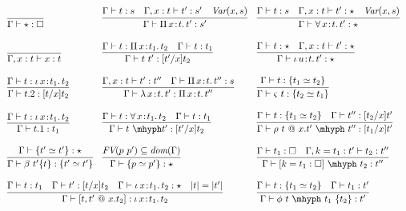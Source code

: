 \documentclass{article}
\newcommand{\abs}[4]{{#1}\, #2\! : \! #3.\, #4}
\begin{document}
\begin{figure}
  \[
  \begin{array}{lll}
    \infer{\Gamma\vdash \star : \Box}{\ } &
    \infer{\Gamma\vdash\abs{\Pi}{x}{t}{t'} : s'}{\Gamma \vdash t : s \quad \Gamma,x:t\vdash t' : s' \quad \textit{Var}(x,s)} &
    \infer{\Gamma\vdash\abs{\forall}{x}{t}{t'} : \star}{\Gamma \vdash t : s \quad \Gamma,x:t\vdash t' : \star \quad \textit{Var}(x,s)} 
    \\ \\
    \infer{\Gamma, x : t \vdash x : t}{\ } &
    \infer{\Gamma\vdash t\ t' : [t'/x]t_2}{\Gamma\vdash t : \abs{\Pi}{x}{t_1}{t_2} & \Gamma\vdash t : t_1} &
    \infer{\Gamma\vdash\abs{\iota}{u}{t}{t'} : \star}{\Gamma \vdash t : \star \quad \Gamma,x:t\vdash t' : \star} 
    \\ \\
    \infer{\Gamma\vdash t.2 : [t/x]t_2}{\Gamma\vdash t : \abs{\iota}{x}{t_1}{t_2}} &    
    \infer{\Gamma\vdash\abs{\lambda}{x}{t}{t'} : \abs{\Pi}{x}{t}{t''}}{\Gamma,x:t\vdash t':t'' \quad \Gamma \vdash \abs{\Pi}{x}{t}{t''} : s}  &
    \infer{\Gamma\vdash \varsigma\ t : \{ t_2 \simeq t_1\}}{\Gamma\vdash t : \{t_1 \simeq t_2\}}

\\ \\
    \infer{\Gamma\vdash t.1 : t_1}{\Gamma\vdash t : \abs{\iota}{x}{t_1}{t_2}} &
    \infer{\Gamma\vdash t\ \mhyph t' : [t'/x]t_2}{\Gamma\vdash t : \abs{\forall}{x}{t_1}{t_2} & \Gamma\vdash t : t_1} &
    \infer{\Gamma\vdash \rho\ t\ @\ x.t'\ \mhyph\ t'' : [t_1/x]t'}{\Gamma \vdash t : \{ t_1 \simeq t_2 \} \quad \Gamma\vdash t'' : [t_2/x]t'}
    \\ \\
    \infer{\Gamma\vdash \beta\ t'\{t\} : \{ t' \simeq t'\}}{\Gamma\vdash \{ t' \simeq t' \} : \star } &
    \infer{\Gamma\vdash \{ p \simeq p'\} : \star}{\textit{FV}(p\ p')\subseteq \textit{dom}(\Gamma)} &
     \infer{\Gamma\vdash [ k = t_1 : \Box ]\ \mhyph\ t_2 : t''}{\Gamma\vdash t_1 : \Box \quad
                                                               \Gamma, k = t_1 : t' \vdash t_2 : t''}  
    \\ \\
    \multicolumn{2}{l}{
    \infer{\Gamma\vdash [t,t'\ @\ x.t_2] : \abs{\iota}{x}{t_1}{t_2}}{\Gamma\vdash t : t_1 \quad \Gamma\vdash t' : [t/x]t_2 \quad \Gamma \vdash \abs{\iota}{x}{t_1}{t_2} : \star \quad |t| = |t'|}} &  
  \infer{\Gamma\vdash \phi\ t\ \mhyph\ t_1\ \{t_2\} : t'}{\Gamma \vdash t : \{t_1 \simeq t_2\} \quad \Gamma\vdash t_1 : t'}  
    \\ \\


\end{array}\]
\end{figure}
\end{document}

